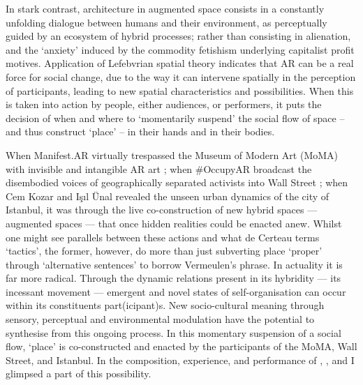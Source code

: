 In stark contrast, architecture in augmented space consists in a constantly unfolding dialogue between humans and their environment, as perceptually guided by an ecosystem of hybrid processes; rather than consisting in alienation, and the `anxiety' induced by the commodity fetishism underlying capitalist profit motives. Application of Lefebvrian spatial theory indicates that AR can be a real force for social change, due to the way it can intervene spatially in the perception of participants, leading to new spatial characteristics and possibilities. When this is taken into action by people, either audiences, or performers, it puts the decision of when and where to `momentarily suspend' the social flow of space -- and thus construct `place' -- in their hands and in their bodies.

When Manifest.AR virtually trespassed the Museum of Modern Art (MoMA) with invisible and intangible AR art \citep{veenhof2010}; when \#OccupyAR broadcast the disembodied voices of geographically separated activists into Wall Street \citep{skwarek2018}; when Cem Kozar and Işıl Ünal \citeyearpar{thiel2011,thiel2018} revealed the unseen urban dynamics of the city of Istanbul, it was through the live co-construction of new hybrid spaces — augmented spaces — that once hidden realities could be enacted anew. Whilst one might see parallels between these actions and what de Certeau terms `tactics', the former, however, do more than just subverting place `proper' through `alternative sentences' to borrow Vermeulen's phrase. In actuality it is far more radical. Through the dynamic relations present in its hybridity — its incessant movement — emergent and novel states of self-organisation can occur within its constituents part(icipant)s. New socio-cultural meaning through sensory, perceptual and environmental modulation have the potential to synthesise from this ongoing process. In this momentary suspension of a social flow, `place' is co-constructed and enacted by the participants of the MoMA, Wall Street, and Istanbul. In the composition, experience, and performance of \textit{}, \textit{}, and \textit{} I glimpsed a part of this possibility.



